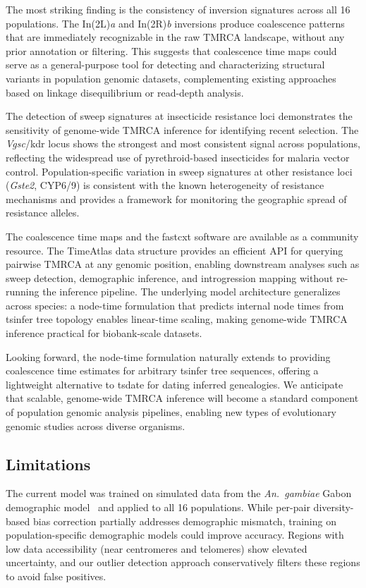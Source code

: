 \documentclass[10pt]{article}
\begin{document}
The most striking finding is the consistency of inversion signatures across
all 16 populations. The In(2L)\textit{a} and In(2R)\textit{b} inversions
produce coalescence patterns that are immediately recognizable in the raw
TMRCA landscape, without any prior annotation or filtering. This suggests
that coalescence time maps could serve as a general-purpose tool for
detecting and characterizing structural variants in population genomic
datasets, complementing existing approaches based on linkage disequilibrium
or read-depth analysis.

The detection of sweep signatures at insecticide resistance loci
demonstrates the sensitivity of genome-wide TMRCA inference for identifying
recent selection. The \textit{Vgsc}/kdr locus shows the strongest and most
consistent signal across populations, reflecting the widespread use of
pyrethroid-based insecticides for malaria vector control. Population-specific
variation in sweep signatures at other resistance loci (\textit{Gste2},
CYP6/9) is consistent with the known heterogeneity of resistance mechanisms
and provides a framework for monitoring the geographic spread of resistance
alleles.

The coalescence time maps and the fastcxt software are available as a
community resource. The TimeAtlas data structure provides an efficient API
for querying pairwise TMRCA at any genomic position, enabling downstream
analyses such as sweep detection, demographic inference, and introgression
mapping without re-running the inference pipeline. The underlying model
architecture generalizes across species: a node-time formulation that
predicts internal node times from tsinfer tree topology enables linear-time
scaling, making genome-wide TMRCA inference practical for biobank-scale
datasets.

Looking forward, the node-time formulation naturally extends to providing
coalescence time estimates for arbitrary tsinfer tree sequences, offering a
lightweight alternative to tsdate for dating inferred genealogies. We
anticipate that scalable, genome-wide TMRCA inference will become a standard
component of population genomic analysis pipelines, enabling new types of
evolutionary genomic studies across diverse organisms.

\subsection*{Limitations}

The current model was trained on simulated data from the
\textit{An.~gambiae} Gabon demographic model~\citep{stdpopsim2020catalog}
and applied to all 16 populations. While per-pair diversity-based bias
correction partially addresses demographic mismatch, training on
population-specific demographic models could improve accuracy. Regions with
low data accessibility (near centromeres and telomeres) show elevated
uncertainty, and our outlier detection approach conservatively filters these
regions to avoid false positives.
\end{document}
